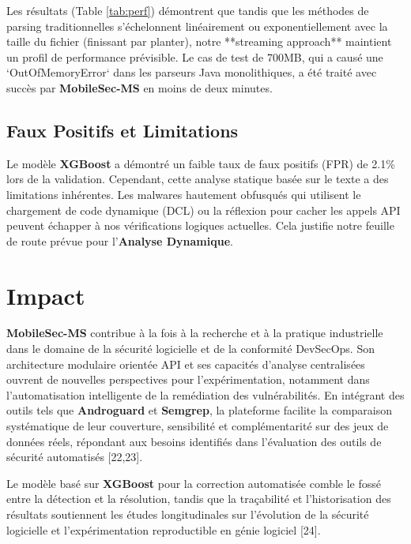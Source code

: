 \documentclass[
  journal=largetwo,
  manuscript=article-type,
  year=2025,
  volume=1,
]{cup-journal}
\begin{document}
Les résultats (Table \ref{tab:perf}) démontrent que tandis que les méthodes de parsing traditionnelles s'échelonnent linéairement ou exponentiellement avec la taille du fichier (finissant par planter), notre **streaming approach** maintient un profil de performance prévisible. Le cas de test de 700MB, qui a causé une `OutOfMemoryError` dans les parseurs Java monolithiques, a été traité avec succès par \textbf{MobileSec-MS} en moins de deux minutes.

\subsection{Faux Positifs et Limitations}
Le modèle \textbf{XGBoost} a démontré un faible taux de faux positifs (FPR) de 2.1\% lors de la validation. Cependant, cette analyse statique basée sur le texte a des limitations inhérentes. Les malwares hautement obfusqués qui utilisent le chargement de code dynamique (DCL) ou la réflexion pour cacher les appels API peuvent échapper à nos vérifications logiques actuelles. Cela justifie notre feuille de route prévue pour l'\textbf{Analyse Dynamique}.

\section{Impact}
\label{sec:impact}

\textbf{MobileSec-MS} contribue à la fois à la recherche et à la pratique industrielle dans le domaine de la sécurité logicielle et de la conformité DevSecOps. Son architecture modulaire orientée API et ses capacités d'analyse centralisées ouvrent de nouvelles perspectives pour l'expérimentation, notamment dans l'automatisation intelligente de la remédiation des vulnérabilités. En intégrant des outils tels que \textbf{Androguard} et \textbf{Semgrep}, la plateforme facilite la comparaison systématique de leur couverture, sensibilité et complémentarité sur des jeux de données réels, répondant aux besoins identifiés dans l'évaluation des outils de sécurité automatisés [22,23].

Le modèle basé sur \textbf{XGBoost} pour la correction automatisée comble le fossé entre la détection et la résolution, tandis que la traçabilité et l'historisation des résultats soutiennent les études longitudinales sur l'évolution de la sécurité logicielle et l'expérimentation reproductible en génie logiciel [24].
\end{document}
